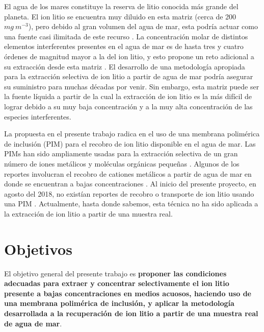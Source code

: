 El agua de los mares constituye la reserva de litio conocida más grande del planeta. El ion litio se encuentra muy diluido en esta matriz (cerca de 200~$mg~m^{-3}$), pero debido al gran volumen del agua de mar, esta podría actuar como una fuente casi ilimitada de este recurso \citep{Yang2018}. La concentración molar de distintos elementos interferentes presentes en el agua de mar es de hasta tres y cuatro órdenes de magnitud mayor a la del ion litio, y esto propone un reto adicional a su extracción desde esta matriz \citep{LI2019117317}. El desarrollo de una metodología apropiada para la extracción selectiva de ion litio a partir de agua de mar podría asegurar su suministro para muchas décadas por venir. Sin embargo, esta matriz puede ser la fuente líquida a partir de la cual la extracción de ion litio es la más difícil de lograr debido a su muy baja concentración y a la muy alta concentración de las especies interferentes.

La propuesta en el presente trabajo radica en el uso de una membrana polimérica de inclusión (PIM) para el recobro de ion litio disponible en el agua de mar. Las \ac{PIM}s han sido ampliamente usadas para la extracción selectiva de un gran número de iones metálicos y moléculas orgánicas pequeñas \citep{Nghiem2006}. Algunos de los reportes involucran el recobro de cationes metálicos a partir de agua de mar en donde se encuentran a bajas concentraciones \citep{Pont2008, Scindia2005}. Al inicio del presente proyecto, en agosto del 2018, no existían reportes de recobro o transporte de ion litio usando una PIM \citep{Cai2019}. Actualmente, hasta donde sabemos, esta técnica no ha sido aplicada a la extracción de ion litio a partir de una muestra real.

\section{Objetivos}
El objetivo general del presente trabajo es \textbf{proponer las condiciones adecuadas para extraer y concentrar selectivamente el ion litio presente a bajas concentraciones en medios acuosos, haciendo uso de una membrana polimérica de inclusión, y aplicar la metodología desarrollada a la recuperación de ion litio a partir de una muestra real de agua de mar}.

